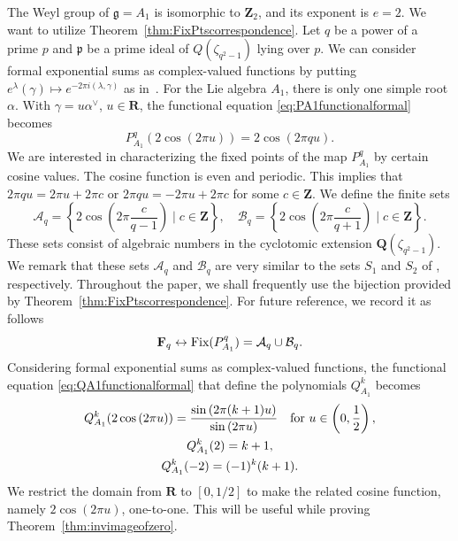 \documentclass{amsart}
\newcommand{\mf}{\mathfrak}
\newcommand{\mc}{\mathcal}
\newcommand{\R}{\mathbf R}
\newcommand{\Q}{\mathbf Q}
\newcommand{\Z}{\mathbf Z}
\newcommand{\F}{\mathbf F}
\newcommand{\Fix}{\textnormal{Fix}}
\numberwithin{equation}{section}
\theoremstyle{plain}
\theoremstyle{definition}
\begin{document}
The Weyl group of $\mf{g}=A_1$ is isomorphic to $\Z_2$, and its exponent is $e=2$. We want to utilize Theorem~\ref{thm:FixPtscorrespondence}. Let $q$ be a power of a prime $p$ and $\mf{p}$ be a prime ideal of $Q(\zeta_{q^2-1})$ lying over $p$. We can consider formal exponential sums as complex-valued functions by putting $e^\lambda(\gamma)\mapsto e^{-2\pi i(\lambda,\gamma)}$ as in~\cite[Lemma 4.1]{hoffmanwithers1988}. For the Lie algebra $A_1$, there is only one simple root $\alpha$. With $\gamma=u\alpha^\vee$, $u\in\R$, the functional equation \eqref{eq:PA1functionalformal} becomes
$$P_{A_{1}}^{q}(2 \cos(2\pi u)) = 2 \cos(2\pi qu).$$
We are interested in characterizing the fixed points of the map  $P_{A_{1}}^{q}$ by certain cosine values. The cosine function is even and periodic. This implies that $2\pi qu = 2\pi u + 2\pi c$  or $2\pi qu = -2\pi u + 2\pi c$ for some $c \in \mathbf{Z}$. We define the finite sets
$$\mc{A}_{q} = \left\{ 2\cos\left(2\pi \frac{c}{q-1}\right) \mid c \in \mathbf{Z} \right\}, \quad \mc{B}_{q} = \left\{ 2\cos\left(2\pi \frac{c}{q+1}\right) \mid c \in \mathbf{Z} \right\}.$$
These sets consist of algebraic numbers in the cyclotomic extension $\Q(\zeta_{q^2-1})$. We remark that these sets $\mc{A}_{q}$ and $\mc{B}_{q}$ are very similar to the sets $S_1$ and $S_2$ of \cite{cohen1994}, respectively. Throughout the paper, we shall frequently use the bijection
provided by Theorem~\ref{thm:FixPtscorrespondence}. For future reference, we record it as follows
\begin{equation}\label{eq:one-to-one}
	\F_q \leftrightarrow \Fix(P_{A_{1}}^{q}) = \mc{A}_{q} \cup \mc{B}_{q}.
\end{equation}
Considering formal exponential sums as complex-valued functions, the functional equation \eqref{eq:QA1functionalformal} that define the polynomials $Q^k_{A_1}$ becomes
\begin{equation}\label{eq:QA1functionaltrigo}
	\begin{gathered}
		Q^k_{A_1}(2\cos{(2\pi u)})=\frac{\sin{(2\pi(k+1)u)}}{\sin{(2\pi u)}} \text{\quad for } u \in \left(0,\frac{1}{2}\right),\\
		Q^k_{A_1}(2)=k+1,\\
		Q^k_{A_1}(-2)=(-1)^k(k+1).
	\end{gathered}
\end{equation}
We restrict the domain from $\R$ to $[0,1/2]$ to make the related cosine function, namely $2\cos(2\pi u)$, one-to-one. This will be useful while proving Theorem~\ref{thm:invimageofzero}. 
\end{document}
